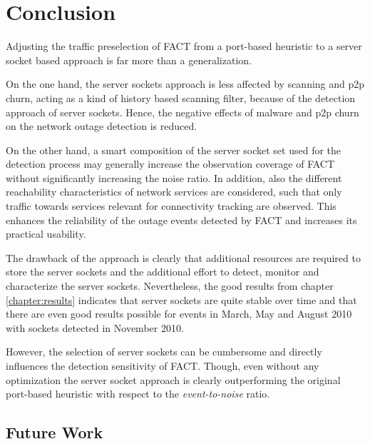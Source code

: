 \chapter{Conclusion\label{chapter:conclusion}}

Adjusting the traffic preselection of \gls{FACT} from a port-based heuristic to a \gls{server socket} based approach is far more than a generalization. 

On the one hand, the \glspl{server socket} approach is less affected by scanning and \gls{p2p} churn, acting as a kind of history based scanning filter, because of the detection approach of \glspl{server socket}.
Hence, the negative effects of malware and \gls{p2p} churn on the network outage detection is reduced. 

On the other hand, a smart composition of the \gls{server socket} set used for the detection process may generally increase the observation coverage of \gls{FACT} without significantly increasing the noise ratio. In addition, also the different reachability characteristics of network services are considered, such that only traffic towards services relevant for connectivity tracking are observed. This enhances the reliability of the outage events detected by \gls{FACT} and increases its practical usability.

The drawback of the approach is clearly that additional resources are required to store the \glspl{server socket} and the additional effort to detect, monitor and characterize the \glspl{server socket}. 
Nevertheless, the good results from chapter \ref{chapter:results} indicates that server sockets are quite stable over time and that there are even good results possible for events in March, May and August 2010 with sockets detected in 
November 2010. 

However, the selection of \glspl{server socket} can be cumbersome and directly influences the detection sensitivity of \gls{FACT}.
Though, even without any optimization the \gls{server socket} approach is clearly outperforming the original port-based heuristic with respect to the \emph{event-to-noise} ratio. 

\newpage
\section{Future Work}

